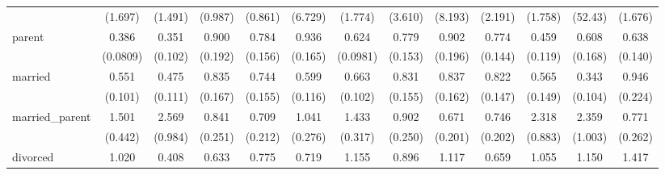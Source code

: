 {\begin{tabular}{l*{12}{c}}
                    &     (1.697)         &     (1.491)         &     (0.987)         &     (0.861)         &     (6.729)         &     (1.774)         &     (3.610)         &     (8.193)         &     (2.191)         &     (1.758)         &     (52.43)         &     (1.676)         \\
[1em]
parent              &       0.386\sym{***}&       0.351\sym{***}&       0.900         &       0.784         &       0.936         &       0.624\sym{**} &       0.779         &       0.902         &       0.774         &       0.459\sym{**} &       0.608         &       0.638\sym{*}  \\
                    &    (0.0809)         &     (0.102)         &     (0.192)         &     (0.156)         &     (0.165)         &    (0.0981)         &     (0.153)         &     (0.196)         &     (0.144)         &     (0.119)         &     (0.168)         &     (0.140)         \\
[1em]
married             &       0.551\sym{**} &       0.475\sym{**} &       0.835         &       0.744         &       0.599\sym{**} &       0.663\sym{**} &       0.831         &       0.837         &       0.822         &       0.565\sym{*}  &       0.343\sym{***}&       0.946         \\
                    &     (0.101)         &     (0.111)         &     (0.167)         &     (0.155)         &     (0.116)         &     (0.102)         &     (0.155)         &     (0.162)         &     (0.147)         &     (0.149)         &     (0.104)         &     (0.224)         \\
[1em]
married\_parent      &       1.501         &       2.569\sym{*}  &       0.841         &       0.709         &       1.041         &       1.433         &       0.902         &       0.671         &       0.746         &       2.318\sym{*}  &       2.359\sym{*}  &       0.771         \\
                    &     (0.442)         &     (0.984)         &     (0.251)         &     (0.212)         &     (0.276)         &     (0.317)         &     (0.250)         &     (0.201)         &     (0.202)         &     (0.883)         &     (1.003)         &     (0.262)         \\
[1em]
divorced            &       1.020         &       0.408\sym{**} &       0.633         &       0.775         &       0.719         &       1.155         &       0.896         &       1.117         &       0.659         &       1.055         &       1.150         &       1.417         \\

\end{tabular}}
